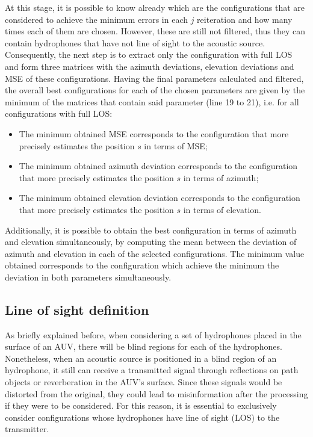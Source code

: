 At this stage, it is possible to know already which are the configurations that are considered to achieve the minimum errors in each $j$ reiteration and how many times each of them are chosen. However, these are still not filtered, thus they can contain hydrophones that have not line of sight to the acoustic source. Consequently, the next step is to extract only the configuration with full LOS and form three matrices with the azimuth deviations, elevation deviations and MSE of these configurations. Having the final parameters calculated and filtered, the overall best configurations for each of the chosen parameters are given by the minimum of the matrices that contain said parameter (line 19 to 21), i.e. for all configurations with full LOS:

\begin{itemize}
	
	\item  The minimum obtained MSE corresponds to the configuration that more precisely estimates the position $s$ in terms of MSE;
	
	\item The minimum obtained azimuth deviation corresponds to the configuration that more precisely estimates the position $s$ in terms of azimuth;
	
	\item The minimum obtained elevation deviation corresponds to the configuration that more precisely estimates the position $s$ in terms of elevation.
	
\end{itemize}

Additionally, it is possible to obtain the best configuration in terms of azimuth and elevation simultaneously, by computing the mean between the deviation of azimuth and elevation in each of the selected configurations. The minimum value obtained corresponds to the configuration which achieve the minimum the deviation in both parameters simultaneously.

\subsection{Line of sight definition} \label{subsec:lineofsight}


As briefly explained before, when considering a set of hydrophones placed in the surface of an AUV, there will be blind regions for each of the hydrophones. Nonetheless, when an acoustic source is positioned in a blind region of an hydrophone, it still can receive a transmitted signal through reflections on path objects or reverberation in the AUV's surface. Since these signals would be distorted from the original, they could lead to misinformation after the processing if they were to be considered. For this reason, it is essential to exclusively consider configurations whose hydrophones have line of sight (LOS) to the transmitter. 

